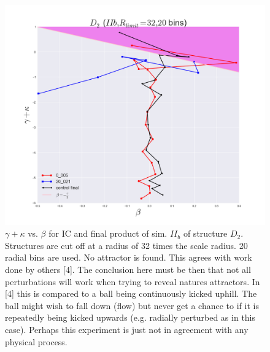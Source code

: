 \begin{figure}[!htbp]
\centering
\includegraphics[width=1.0\linewidth]{img/beta_vs_gamma_plus_kappa_IIb_D2_Rlimit32.png}
\caption{$\gamma + \kappa$ vs. $\beta$ for IC and final product of sim. $II_b$ of structure $D_2$.
Structures are cut off at a radius of 32 times the scale radius. 20 radial bins are used.
No attractor is found. This agrees with work done by others [4]. The conclusion here must be then that not all perturbations will work when trying to reveal natures attractors. In [4] this is compared to a ball being continuously kicked uphill. The ball might wish to fall down (flow) but never get a chance to if it is repeatedly being kicked upwards (e.g. radially perturbed as in this case). Perhaps this experiment is just not in agreement with any physical process.}
\label{fig:test}
\end{figure}

